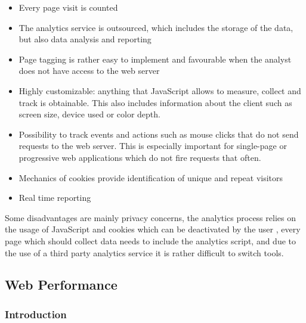 \begin{itemize}
\item Every page visit is counted %
\item The analytics service is outsourced, which includes the storage of the data, but also data analysis and reporting %
\item Page tagging is rather easy to implement and favourable when the analyst does not have access to the web server %
\item Highly customizable: anything that JavaScript allows to measure, collect and track is obtainable. This also includes information about the client such as screen size, device used or color depth. %
\item Possibility to track events and actions such as mouse clicks that do not send requests to the web server. This is especially important for single-page or progressive web applications which do not fire requests that often. %
\item Mechanics of cookies provide identification of unique and repeat visitors %
\item Real time reporting %
\end{itemize}



Some disadvantages are mainly privacy concerns, the analytics process relies on the usage of JavaScript and cookies which can be deactivated by the user %
, every page which should collect data needs to include the analytics script, and due to the use of a third party analytics service it is rather difficult to switch tools. %









\subsection{Web Performance}


\subsubsection{Introduction}

